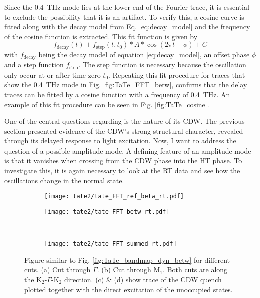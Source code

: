 Since the \qty{0.4}{\tera\hertz} mode lies at the lower end of the Fourier trace, it is essential to exclude the possibility that it is an artifact.
To verify this, a cosine curve is fitted along with the decay model from Eq. \ref{eq:decay_model} and the frequency of the cosine function is extracted. 
This fit function is given by
\begin{equation}
	f_\text{decay}(t) + f_\text{step}(t, t_0) * A * \cos(2\pi t+\phi) + C
\end{equation}
with $f_\text{decay}$ being the decay model of equation \ref{eq:decay_model}, an offset phase $\phi$ and a step function $f_\text{step}$.
The step function is necessary because the oscillation only occur at or after time zero $t_0$.
Repeating this fit procedure for traces that show the \qty{0.4}{\tera\hertz} mode in Fig. \ref{fig:TaTe_FFT_betw}, confirms that the delay traces can be fitted by a cosine function with a frequency of \qty{0.4}{\tera\hertz}.
An example of this fit procedure can be seen in Fig. \ref{fig:TaTe_cosine}.

One of the central questions regarding  is the nature of its CDW.
The previous section presented evidence of the CDW's strong structural character, revealed through its delayed response to light excitation.
Now, I want to address the question of a possible amplitude mode.
A defining feature of an amplitude mode is that it vanishes when crossing from the CDW phase into the HT phase.
To investigate this, it is again necessary to look at the RT data and see how the oscillations change in the normal state.

\begin{figure}[b!]
	\centering
	\begin{subfigure}[b]{0.33\textwidth}
		\texttt{[image: tate2/tate\_FFT\_ref\_betw\_rt.pdf]}
		\caption{}
	\end{subfigure}
	\begin{subfigure}[b]{0.66\textwidth}
		\texttt{[image: tate2/tate\_FFT\_betw\_rt.pdf]}
		\caption{}
	\end{subfigure}
	\\
	\begin{subfigure}[b]{0.33\textwidth}
		\texttt{[image: tate2/tate\_FFT\_summed\_rt.pdf]}
		\caption{}
	\end{subfigure}
	\caption{Figure similar to Fig. \ref{fig:TaTe_bandmap_dyn_betw} for different cuts. (a) Cut through $\Gamma$. (b) Cut through M$_1$. Both cuts are along the K$_2$-$\Gamma$-K$_2$ direction. (c) \& (d) show trace of the CDW quench plotted together with the direct excitation of the unoccupied states.}
	\label{fig:TaTe_FFT_betw_rt}
\end{figure}

